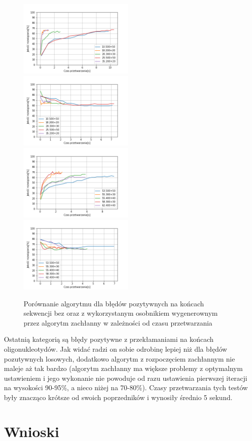 \documentclass{article}
\begin{document}
\begin{figure}[H]
\includegraphics[width=0.5\textwidth]{Czaspoz-oli1.png}
\includegraphics[width=0.5\textwidth]{Czaspoz-oli-greedy1.png}
\includegraphics[width=0.5\textwidth]{Czaspoz-oli2.png}
\includegraphics[width=0.5\textwidth]{Czaspoz-oli-greedy2.png}
\caption{Porównanie algorytmu dla błędów pozytywnych na końcach sekwencji bez oraz z wykorzystanym osobnikiem wygenerownym przez algorytm zachłanny w zależności od czasu przetwarzania}
\end{figure}
Ostatnią kategorią są błędy pozytywne z przekłamaniami na końcach oligonukleotydów. Jak widać radzi on sobie odrobinę lepiej niż dla błędów pozutywnych losowych, dodatkowo algorytm z rozpoczęciem zachłannym nie maleje aż tak bardzo (algorytm zachłanny ma większe problemy z optymalnym ustawieniem i jego wykonanie nie powoduje od razu ustawienia pierwszej iteracji na wysokości 90-95\%, a nieco niżej na 70-80\%). Czasy przetwarzania tych testów były znacząco krótsze od swoich poprzedników i wynosiły średnio 5 sekund.
\section{Wnioski}
\end{document}
